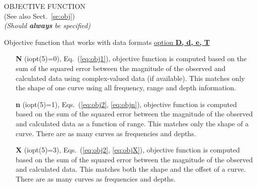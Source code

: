\documentclass{saclantc}
\begin{document}
\noindent OBJECTIVE FUNCTION\\
(See also Sect.~\ref{se:obj})\\
{\it (Should {\bf always} be specified)}

Objective function that works with data formats \underline{option {\bf
D, d, e, T}}
\vspace{-0.6cm}
\begin{itemize}
    \item[{\bf N}] (iopt(5)=0), Eq.\ (\ref{eq:obj1}), objective function is computed based on 
  the sum of the  squared error between the magnitude of the observed and
calculated data using complex-valued data (if available).
This matches only the shape of one curve using all frequency, range and
depth information.
\vspace{-0.3cm}
    \item[{\bf n}] (iopt(5)=1), Eqs.\ (\ref{eq:obj2}, \ref{eq:objn}),  objective function is computed based on 
  the sum of the  squared error between the magnitude of the observed and
calculated data as a function of range.
This matches only the shape of a curve. 
There are as many curves as frequencies and depths.
\vspace{-0.3cm}
    \item[{\bf X}] (iopt(5)=3),  Eqs.\ (\ref{eq:obj2}, \ref{eq:objX}),  objective function is computed
based on 
   the sum of the  squared error between the magnitude of the observed and calculated data.
    This matches both the shape and the offset of a curve.
There are as many curves as frequencies and depths.
\end{itemize}
\end{document}
